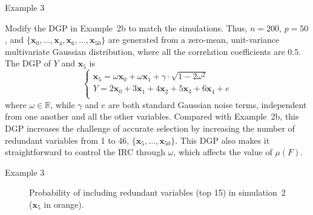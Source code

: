 \documentclass{beamer}
\begin{document}
\begin{frame}{Example 3}  
  
  Modify the DGP in Example~2b to match the \citet{zhaoyu06} simulations. Thus, $n = 200$, $p = 50$, and $\{\mathbf{x}_0, \ldots, \mathbf{x}_4, \mathbf{x}_6, \ldots, \mathbf{x}_{50}\}$ are generated from a zero-mean, unit-variance multivariate Gaussian distribution, where all the correlation coefficients are $0.5$. The DGP of $Y$ and $\mathbf{x}_5$ is
  \begin{equation}
    \begin{cases}
      \mathbf{x}_5 = \omega \mathbf{x}_0 + \omega \mathbf{x}_1 + \gamma\cdot \sqrt{1 - 2\omega^2} \\
      Y = 2 \mathbf{x}_0 + 3\mathbf{x}_1 + 4 \mathbf{x}_2 + 5 \mathbf{x}_3 + 6 \mathbf{x}_4 + e \\
    \end{cases}
    \label{eqn:dgp_x5}
  \end{equation}
  where $\omega \in \mathbb{R}$, while $\gamma$ and $e$ are both standard Gaussian noise terms, independent from one another and all the other variables. Compared with Example~2b, this DGP increases the challenge of accurate selection by increasing the number of redundant variables from 1 to 46, $\{\mathbf{x}_5, \ldots, \mathbf{x}_{50}\}$. This DGP also makes it straightforward to control the IRC through $\omega$, which affects the value of $\mu \left( F \right)$.

\end{frame}

\begin{frame}{Example 3}  

  \begin{figure}
    \centering

    \caption{Probability of including redundant variables (top 15) in simulation~2 ($\mathbf{x}_5$ in orange).}
    \label{fig:solar_ic_type-II}
  \end{figure}

\end{frame}
\end{document}
